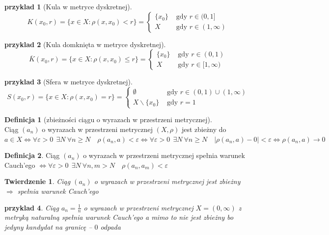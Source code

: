 \documentclass[12pt,a4paper]{article}
\newtheorem{tw}{Twierdzenie}
\newtheorem{przyklad}{przyklad}
\theoremstyle{definition}
\newtheorem{df}{Definicja}
\begin{document}
\begin{przyklad}[Kula w metryce dyskretnej]
$$K(x_0, r) = \{x\in X: \rho(x,x_0) < r\} = \begin{cases}
	\{x_0\} &\text{ gdy } r\in (0,1]\\
	X &\text{ gdy } r\in (1, \infty)
\end{cases}$$
\end{przyklad}
\begin{przyklad}[Kula domknięta w metryce dyskretnej]
$$\overline{K}(x_0, r) = \{x\in X: \rho(x,x_0) \leqslant r\} = \begin{cases}
	\{x_0\} &\text{ gdy } r\in (0,1)\\
	X &\text{ gdy } r\in [1, \infty)
\end{cases}$$
\end{przyklad}
\begin{przyklad}[Sfera w metryce dyskretnej]
$$S(x_0, r) = \{x\in X: \rho(x,x_0) = r\} = \begin{cases}
	\emptyset &\text{ gdy } r\in (0,1) \cup (1,\infty)\\
	X\smallsetminus\{x_0\} &\text{ gdy } r=1
\end{cases}$$
\end{przyklad}

\begin{df}[zbieżności ciągu o wyrazach w przestrzeni metrycznej]~\\
Ciąg $(a_n)$ o wyrazach w przestrzeni metrycznej $(X, \rho)$ jest zbieżny do $a\in X \Leftrightarrow \forall\varepsilon >0~~ \exists N ~ \forall n \geqslant N \quad \rho(a_n, a) < \varepsilon \Leftrightarrow \forall\varepsilon >0~~ \exists N ~ \forall n \geqslant N \quad |\rho(a_n, a) - 0| < \varepsilon \Leftrightarrow \rho(a_n, a) \rightarrow 0$
\end{df}

\begin{df}
Ciąg $(a_n)$ o wyrazach w przestrzeni metrycznej spełnia warunek Cauch'ego $\Leftrightarrow \forall \varepsilon >0 ~~ \exists N ~ \forall n,m > N \quad \rho(a_n, a_m) < \varepsilon$
\end{df}

\begin{tw}
Ciąg $(a_n)$ o wyrazach w przestrzeni metrycznej jest zbieżny $\Rightarrow$ spełnia warunek Cauch'ego
\end{tw}

\begin{przyklad}
Ciąg $a_n = \frac{1}{n}$ o wyrazach w przestrzeni metrycznej $X = (0, \infty)$ z metryką naturalną spełnia warunek Cauch'ego a mimo to nie jest zbieżny bo jedyny kandydat na granicę -- $0$ odpada
\end{przyklad}
\end{document}
